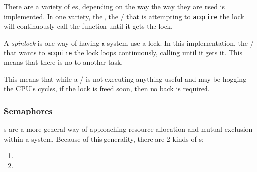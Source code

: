There are a variety of es, depending on the way the way they are used is implemented.
In one variety, the , the / that is attempting to \texttt{acquire} the lock will continuously call the  function until it gets the lock.

\begin{definition}[Spinlock]\label{def:Spinlock}
  A \emph{spinlock} is one way of having a system use a  lock.
  In this implementation, the / that wants to \texttt{acquire} the lock loops continuously, calling  until it gets it.
  This means that there is no  to another task.

  This means that while a / is not executing anything useful and may be hogging the CPU's cycles, if the lock is freed soon, then no  back is required.
\end{definition}

\subsubsection{Semaphores}\label{subsubsec:Semaphores}
s are a more general way of approaching resource allocation and mutual exclusion within a system.
Because of this generality, there are 2 kinds of s:
\begin{enumerate}[noitemsep]
\item {}
\item {}
\end{enumerate}

